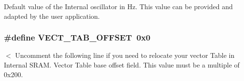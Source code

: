 Default value of the Internal oscillator in Hz. This value can be provided and adapted by the user application. \hypertarget{group___s_t_m32_f3xx___system___private___defines_g40e1495541cbb4acbe3f1819bd87a9fe}{
\subsubsection[{VECT\_\-TAB\_\-OFFSET}]{\setlength{\rightskip}{0pt plus 5cm}\#define VECT\_\-TAB\_\-OFFSET~0x0}}
\label{group___s_t_m32_f3xx___system___private___defines_g40e1495541cbb4acbe3f1819bd87a9fe}


$<$ Uncomment the following line if you need to relocate your vector Table in Internal SRAM. Vector Table base offset field. This value must be a multiple of 0x200. 